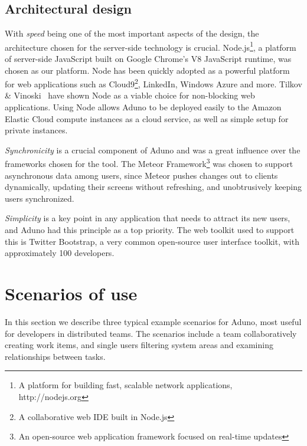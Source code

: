 \documentclass[conference]{IEEEtran}
\begin{document}

\subsection{Architectural design}
With \emph{speed} being one of the most important aspects of the design, the architecture chosen for the server-side technology is crucial.  Node.js\footnote{A platform for building fast, scalable network applications, http://nodejs.org}, a platform of server-side JavaScript built on Google Chrome's V8 JavaScript runtime, was chosen as our platform.  Node has been quickly adopted as a powerful platform for web applications such as Cloud9\footnote{A collaborative web IDE built in Node.js}, LinkedIn, Windows Azure and more.  Tilkov \& Vinoski~\cite{TV10} have shown Node as a viable choice for non-blocking web applications.  Using Node allows Aduno to be deployed easily to the Amazon Elastic Cloud compute instances as a cloud service, as well as simple setup for private instances.

\emph{Synchronicity} is a crucial component of Aduno and was a great influence over the frameworks chosen for the tool.  The Meteor Framework\footnote{An open-source web application framework focused on real-time updates} was chosen to support asynchronous data among users, since Meteor pushes changes out to clients dynamically, updating their screens without refreshing, and unobtrusively keeping users synchronized.  

\emph{Simplicity} is a key point in any application that needs to attract its new users, and Aduno had this principle as a top priority.  The web toolkit used to support this is Twitter Bootstrap, a very common open-source user interface toolkit, with approximately 100 developers.

\section{Scenarios of use}
\label{sec:scenarios}
In this section we describe three typical example scenarios for Aduno, most useful for developers in distributed teams. The scenarios include a team collaboratively creating work items, and single users filtering system areas and examining relationships between tasks.
\end{document}
